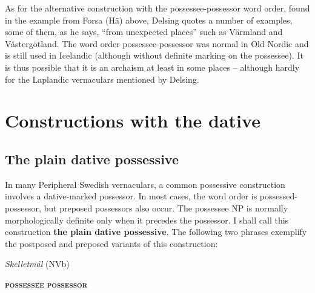 
As for the alternative construction with the possessee-possessor word order, found in the example from Forsa (Hä) above, Delsing quotes a number of examples, some of them, as he says, “from unexpected places” such as Värmland and Västergötland. The word order possessee-possessor was normal in Old Nordic and is still used in Icelandic (although without definite marking on the possessee). It is thus possible that it is an archaism at least in some places – although hardly for the Laplandic vernaculars mentioned by Delsing.


\section{\rmfamily Constructions with the dative}
\label{bkm:Ref136427895}\subsection{\rmfamily The plain dative possessive}

In many Peripheral Swedish vernaculars, a common possessive construction involves a dative-marked possessor. In most cases, the word order is possessed-possessor, but preposed possessors also occur. The possessee NP is normally morphologically definite only when it precedes the possessor. I shall call this construction \textbf{the plain dative possessive}. The following two phrases exemplify the postposed and preposed variants of this construction:


\item 

\textit{Skelletmål} (NVb)



 \ea\label{}
\gll \textbf{\textsc{possessee}} \textbf{\textsc{possessor}} \\

